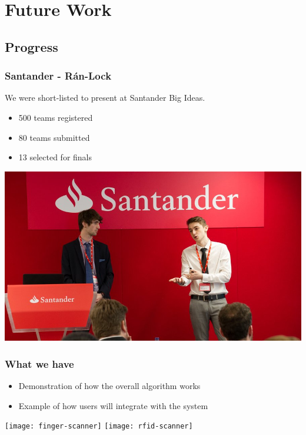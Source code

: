 \documentclass{beamer}
\begin{document}
  \section{Future Work}
    \subsection{Progress}
      \begin{frame}
        \frametitle{Santander - Rán-Lock}
        We were short-listed to present at Santander Big Ideas.
        \begin{itemize}
          \item 500 teams registered
          \item 80 teams submitted
          \item 13 selected for finals
        \end{itemize}
        \vfill
        \begin{center}
          \includegraphics[scale=0.25]{santander}
        \end{center}
      \end{frame}
      \begin{frame}
        \frametitle{What we have}
        \begin{itemize}
          \item Demonstration of how the overall algorithm works
          \item Example of how users will integrate with the system
        \end{itemize}
        \vfill
        \texttt{[image: finger-scanner]}
        \hfill
        \texttt{[image: rfid-scanner]}
      \end{frame}
\end{document}
